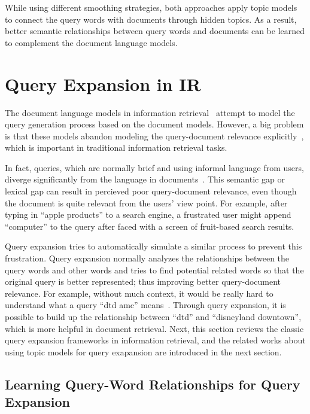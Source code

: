 While using different smoothing strategies, both
approaches apply topic models to
connect the query words with documents through hidden topics. As a
result, better semantic relationships between query words and
documents can be learned to complement the document language models.


\section{Query Expansion in IR}

The document language models in information
retrieval~\citep{PonteCroft} attempt to model the query
generation process based on the document models. However, a big
problem is that these models abandon modeling the query-document
relevance explicitly~\citep{Lavrenko-2001}, which is important in
traditional information retrieval tasks.

In fact, queries, which are normally brief and using informal
language from users, diverge significantly from the language in
documents~\citep{Muller-2009}. This semantic gap or lexical gap can
result in percieved poor query-document relevance, even though the document is
quite relevant from the users' view point. For example, after typing
in ``apple products'' to a search engine, a frustrated user might append
``computer'' to the query after faced with a screen of fruit-based
search results.

Query expansion tries to automatically simulate a similar process to
prevent this frustration. Query expansion normally analyzes the
relationships between the query words and other words and tries to
find potential related words so that the original query is better
represented; thus improving better query-document relevance. For
example, without much context, it would be really hard to understand
what a query ``dtd amc'' means~\citep{Jiang-2016}. Through query
expansion, it is possible to build up the relationship between ``dtd''
and ``disneyland downtown'', which is more helpful in document
retrieval.  Next, this section reviews the classic query expansion
frameworks in information retrieval, and the related works about using
topic models for query exapansion are introduced in the next section.

\subsection{Learning Query-Word Relationships for Query Expansion}

